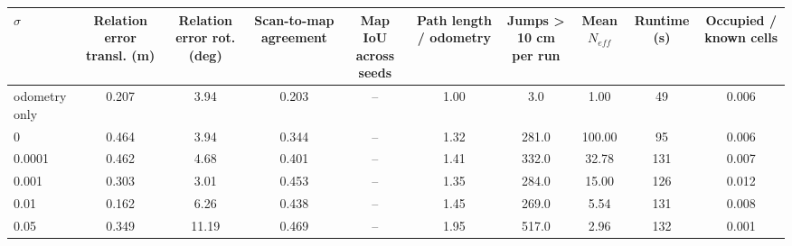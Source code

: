 \begin{tabular}{lccccccccc}
\toprule
$\sigma$ & Relation error transl. (m) & Relation error rot. (deg) & Scan-to-map agreement & Map IoU across seeds & Path length / odometry & Jumps > 10 cm per run & Mean $N_{eff}$ & Runtime (s) & Occupied / known cells \\
\midrule
odometry only & 0.207 & 3.94 & 0.203 & -- & 1.00 & 3.0 & 1.00 & 49 & 0.006 \\
0 & 0.464 & 3.94 & 0.344 & -- & 1.32 & 281.0 & 100.00 & 95 & 0.006 \\
0.0001 & 0.462 & 4.68 & 0.401 & -- & 1.41 & 332.0 & 32.78 & 131 & 0.007 \\
0.001 & 0.303 & 3.01 & 0.453 & -- & 1.35 & 284.0 & 15.00 & 126 & 0.012 \\
0.01 & 0.162 & 6.26 & 0.438 & -- & 1.45 & 269.0 & 5.54 & 131 & 0.008 \\
0.05 & 0.349 & 11.19 & 0.469 & -- & 1.95 & 517.0 & 2.96 & 132 & 0.001 \\
\bottomrule
\end{tabular}

